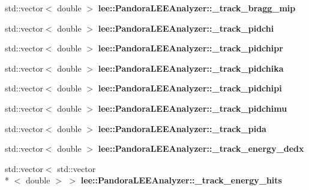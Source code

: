 \begin{DoxyCompactItemize}
\item 
\hypertarget{group__lee_ga54899eb2a96c6b30e3aa350877ee396f}{std\-::vector$<$ double $>$ {\bfseries lee\-::\-Pandora\-L\-E\-E\-Analyzer\-::\-\_\-track\-\_\-bragg\-\_\-mip}}\label{group__lee_ga54899eb2a96c6b30e3aa350877ee396f}

\item 
\hypertarget{group__lee_gad41a5c8f9908d57ca71dafdd1acffa77}{std\-::vector$<$ double $>$ {\bfseries lee\-::\-Pandora\-L\-E\-E\-Analyzer\-::\-\_\-track\-\_\-pidchi}}\label{group__lee_gad41a5c8f9908d57ca71dafdd1acffa77}

\item 
\hypertarget{group__lee_gaecf90a4b535a1eea4a2e46efaed73aee}{std\-::vector$<$ double $>$ {\bfseries lee\-::\-Pandora\-L\-E\-E\-Analyzer\-::\-\_\-track\-\_\-pidchipr}}\label{group__lee_gaecf90a4b535a1eea4a2e46efaed73aee}

\item 
\hypertarget{group__lee_gacd3a6086b23d0242a02a1aaafaa22f21}{std\-::vector$<$ double $>$ {\bfseries lee\-::\-Pandora\-L\-E\-E\-Analyzer\-::\-\_\-track\-\_\-pidchika}}\label{group__lee_gacd3a6086b23d0242a02a1aaafaa22f21}

\item 
\hypertarget{group__lee_gaecc3128a6d2e1ce777b2a47cf8d8592e}{std\-::vector$<$ double $>$ {\bfseries lee\-::\-Pandora\-L\-E\-E\-Analyzer\-::\-\_\-track\-\_\-pidchipi}}\label{group__lee_gaecc3128a6d2e1ce777b2a47cf8d8592e}

\item 
\hypertarget{group__lee_ga92b6e7aa446dda4b3fb5ef6a523417d3}{std\-::vector$<$ double $>$ {\bfseries lee\-::\-Pandora\-L\-E\-E\-Analyzer\-::\-\_\-track\-\_\-pidchimu}}\label{group__lee_ga92b6e7aa446dda4b3fb5ef6a523417d3}

\item 
\hypertarget{group__lee_ga51862c538bdadd1819aa4cc47f37daab}{std\-::vector$<$ double $>$ {\bfseries lee\-::\-Pandora\-L\-E\-E\-Analyzer\-::\-\_\-track\-\_\-pida}}\label{group__lee_ga51862c538bdadd1819aa4cc47f37daab}

\item 
\hypertarget{group__lee_ga548f84dc28b54f42d917780967237fbb}{std\-::vector$<$ double $>$ {\bfseries lee\-::\-Pandora\-L\-E\-E\-Analyzer\-::\-\_\-track\-\_\-energy\-\_\-dedx}}\label{group__lee_ga548f84dc28b54f42d917780967237fbb}

\item 
\hypertarget{group__lee_ga78b31424830aa3c041dbff599185c3bb}{std\-::vector$<$ std\-::vector\\*
$<$ double $>$ $>$ {\bfseries lee\-::\-Pandora\-L\-E\-E\-Analyzer\-::\-\_\-track\-\_\-energy\-\_\-hits}}\label{group__lee_ga78b31424830aa3c041dbff599185c3bb}


\end{DoxyCompactItemize}
